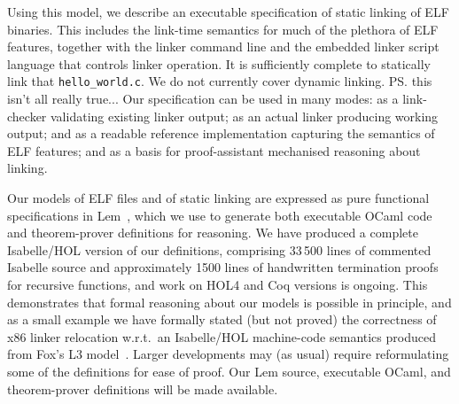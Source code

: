 \begin{verytightitemize}
\item Using this model, we describe an executable specification of static linking of ELF binaries.
This includes the link-time semantics for much of the plethora of ELF features, 
together with the linker command line and the embedded linker script language
that controls linker operation.  It is sufficiently complete to
statically link that 
\texttt{hello\_world.c}.
We do not currently cover dynamic linking.
\ps{this isn't all really true...}
Our specification can be used in many modes: 
as a link-checker validating existing linker output; 
as an actual linker producing working output; 
and as a readable reference implementation capturing the semantics of ELF features; 
and as a basis for proof-assistant mechanised reasoning about
linking. 
\end{verytightitemize}
Our models of ELF files and of static linking 
are expressed as pure functional specifications in
Lem~\cite{mulligan-lem-2014}, which we use to generate both executable
OCaml code and theorem-prover definitions for reasoning.  We have
produced a complete Isabelle/HOL version of our definitions, comprising 33\,500 lines of
commented Isabelle source and approximately 1500 lines of handwritten
termination proofs for recursive functions, and work on HOL4 and Coq
versions is ongoing.  
This demonstrates that formal reasoning about our models is possible
in principle, and as a small example we have formally stated (but not
proved) the
correctness of x86 linker relocation w.r.t.~an Isabelle/HOL
machine-code semantics produced from Fox's L3 model~\cite{DBLP:conf/itp/Fox15}.
Larger developments may (as usual) require
reformulating some of the definitions for ease of proof.  
Our Lem source, executable OCaml, and theorem-prover definitions will be made available. 




